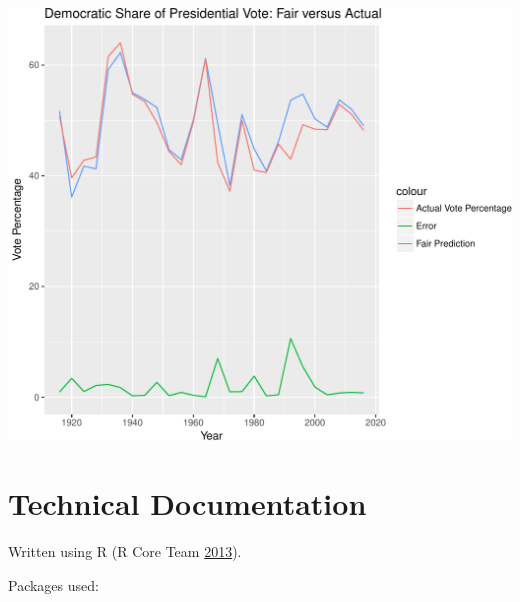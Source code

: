 \documentclass[11,]{article}
\begin{document}
\begin{center}\includegraphics[width=0.65\linewidth]{WriteUp_files/figure-latex/unnamed-chunk-4-1} \end{center}

\hypertarget{technical-documentation}{%
\section{Technical Documentation}\label{technical-documentation}}

Written using R (R Core Team \protect\hyperlink{ref-R}{2013}).

Packages used:
\end{document}
